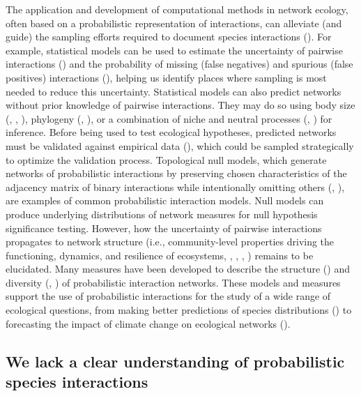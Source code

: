 The application and development of computational methods in network ecology,
often based on a probabilistic representation of interactions, can alleviate
(and guide) the sampling efforts required to document species interactions
(\cite{Strydom2021Roadmapa}). For example, statistical models can be used to
estimate the uncertainty of pairwise interactions
(\cite{Cirtwill2019Quantitative}) and the probability of missing (false
negatives) and spurious (false positives) interactions
(\cite{Guimera2009Missing}), helping us identify places where sampling is most
needed to reduce this uncertainty. Statistical models can also predict networks
without prior knowledge of pairwise interactions. They may do so using body size
(\cite{Petchey2008Size}, \cite{Gravel2013Inferring},
\cite{Caron2024Traitmatching}), phylogeny (\cite{Elmasri2020Hierarchical},
\cite{Strydom2022Food}), or a combination of niche and neutral processes
(\cite{Bartomeus2016Common}, \cite{Pomeranz2019Inferring}) for inference. Before
being used to test ecological hypotheses, predicted networks must be validated
against empirical data (\cite{Brimacombe2024Applying}), which could be sampled
strategically to optimize the validation process. Topological null models, which
generate networks of probabilistic interactions by preserving chosen
characteristics of the adjacency matrix of binary interactions while
intentionally omitting others (\cite{Bascompte2003Nested},
\cite{Fortuna2006Habitat}), are examples of common probabilistic interaction
models. Null models can produce underlying distributions of network measures for
null hypothesis significance testing. However, how the uncertainty of pairwise
interactions propagates to network structure (i.e., community-level properties
driving the functioning, dynamics, and resilience of ecosystems,
\cite{McCann2007Protecting}, \cite{McCann2011Food}, \cite{Proulx2005Network},
\cite{Rooney2012Integrating}) remains to be elucidated. Many measures have been
developed to describe the structure (\cite{Poisot2016Structure}) and diversity
(\cite{Ohlmann2019Diversity}, \cite{Godsoe2022Species}) of probabilistic
interaction networks. These models and measures support the use of probabilistic
interactions for the study of a wide range of ecological questions, from making
better predictions of species distributions (\cite{Cazelles2016Theorya}) to
forecasting the impact of climate change on ecological networks
(\cite{Gilman2010Framework}).

\subsection{We lack a clear understanding of probabilistic species interactions} 

